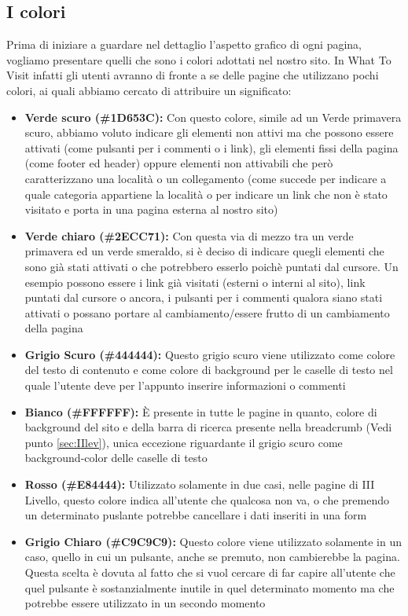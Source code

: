 \subsection{I colori}\label{sec:Pres-Colore}
Prima di iniziare a guardare nel dettaglio l'aspetto grafico di ogni pagina, vogliamo presentare quelli che sono i colori adottati nel nostro sito. In What To Visit infatti gli utenti avranno di fronte a se delle pagine che utilizzano pochi colori, ai quali abbiamo cercato di attribuire un significato:
\begin{itemize}
\item \textbf{Verde scuro (\#1D653C):} Con questo colore, simile ad un Verde primavera scuro, abbiamo voluto indicare gli elementi non attivi ma che possono essere attivati (come pulsanti per i commenti o i link), gli elementi fissi della pagina (come footer ed header) oppure elementi non attivabili che però caratterizzano una località o un collegamento (come succede per indicare a quale categoria appartiene la località o per indicare un link che non è stato visitato e porta in una pagina esterna al nostro sito)
\item \textbf{Verde chiaro (\#2ECC71):} Con questa via di mezzo tra un verde primavera ed un verde smeraldo, si è deciso di indicare quegli elementi che sono già stati attivati o che potrebbero esserlo poichè puntati dal cursore. Un esempio possono essere i link già visitati (esterni o interni al sito), link puntati dal cursore o ancora, i pulsanti per i commenti qualora siano stati attivati o possano portare al cambiamento/essere frutto di un cambiamento della pagina
\item \textbf{Grigio Scuro (\#444444):} Questo grigio scuro viene utilizzato come colore del testo di contenuto e come colore di background per le caselle di testo nel quale l'utente deve per l'appunto inserire informazioni o commenti
\item \textbf{Bianco (\#FFFFFF):} È presente in tutte le pagine in quanto, colore di background del sito e della barra di ricerca presente nella breadcrumb (Vedi punto \ref{sec:IIlev}), unica eccezione riguardante il grigio scuro come background-color delle caselle di testo
\item \textbf{Rosso (\#E84444):} Utilizzato solamente in due casi, nelle pagine di III Livello, questo colore indica all'utente che qualcosa non va, o che premendo un determinato puslante potrebbe cancellare i dati inseriti in una form
\item \textbf{Grigio Chiaro (\#C9C9C9):} Questo colore viene utilizzato solamente in un caso, quello in cui un pulsante, anche se premuto, non cambierebbe la pagina. Questa scelta è dovuta al fatto che si vuol cercare di far capire all'utente che quel pulsante è sostanzialmente inutile in quel determinato momento ma che potrebbe essere utilizzato in un secondo momento
\end{itemize}

